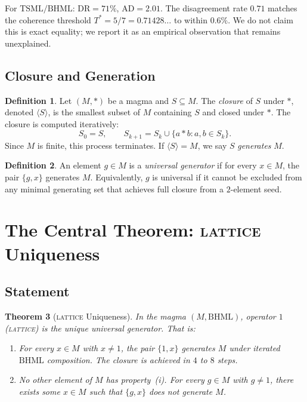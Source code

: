 \documentclass[11pt,a4paper]{article}
\newtheorem{theorem}{Theorem}[section]
\theoremstyle{definition}
\newtheorem{definition}[theorem]{Definition}
\theoremstyle{remark}
\newcommand{\DR}{\mathrm{DR}}
\newcommand{\AD}{\mathrm{AD}}
\newcommand{\TSML}{\mathrm{TSML}}
\newcommand{\BHML}{\mathrm{BHML}}
\newcommand{\gen}[1]{\langle #1 \rangle}
\newcommand{\Tstar}{T^{*}}
\begin{document}
For $\TSML/\BHML$: $\DR = 71\%$, $\AD = 2.01$. The disagreement rate $0.71$ matches the coherence threshold $\Tstar = 5/7 = 0.71428\ldots$ to within $0.6\%$. We do not claim this is exact equality; we report it as an empirical observation that remains unexplained.

\subsection{Closure and Generation}\label{sec:closure}

\begin{definition}\label{def:closure}
Let $(M,\ast)$ be a magma and $S\subseteq M$. The \emph{closure} of $S$ under $\ast$, denoted $\gen{S}$, is the smallest subset of $M$ containing $S$ and closed under $\ast$. The closure is computed iteratively:
\begin{equation}\label{eq:closure}
S_{0} = S, \qquad S_{k+1} = S_{k} \cup \{a\ast b : a,b\in S_{k}\}.
\end{equation}
Since $M$ is finite, this process terminates. If $\gen{S} = M$, we say $S$ \emph{generates} $M$.
\end{definition}

\begin{definition}\label{def:univ-gen}
An element $g\in M$ is a \emph{universal generator} if for every $x\in M$, the pair $\{g,x\}$ generates $M$. Equivalently, $g$ is universal if it cannot be excluded from any minimal generating set that achieves full closure from a $2$-element seed.
\end{definition}

\section{The Central Theorem: \textsc{lattice} Uniqueness}\label{sec:central}

\subsection{Statement}\label{sec:statement}

\begin{theorem}[\textsc{lattice} Uniqueness]\label{thm:lattice}
In the magma $(M,\BHML)$, operator $1$ (\textsc{lattice}) is the unique universal generator. That is:
\begin{enumerate}[label=(\roman*)]
\item For every $x\in M$ with $x\neq 1$, the pair $\{1,x\}$ generates $M$ under iterated $\BHML$ composition. The closure is achieved in $4$ to $8$ steps.
\item No other element of $M$ has property~\textup{(i)}. For every $g\in M$ with $g\neq 1$, there exists some $x\in M$ such that $\{g,x\}$ does not generate $M$.
\end{enumerate}
\end{theorem}
\end{document}
